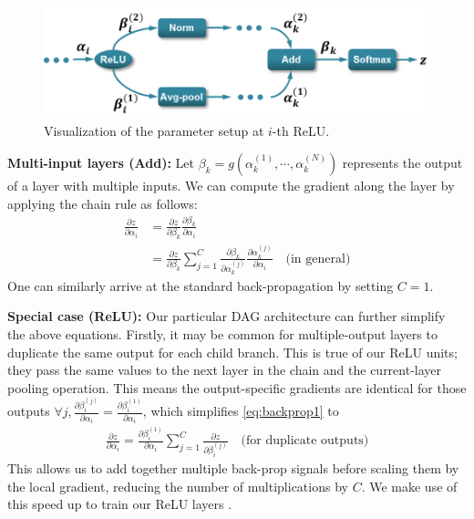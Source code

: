 \documentclass[10pt,twocolumn,letterpaper]{article}
\begin{document}
\begin{figure}[t!]
\centering
	\includegraphics[width=.85\columnwidth]{fig/fig_backprop_eq}
\caption{Visualization of the parameter setup at $i$-th ReLU.}
\label{fig:backprop_eq}
\end{figure}


{\bf Multi-input layers (Add):} Let $\beta_k=g(\alpha^{(1)}_k,\cdots,\alpha^{(N)}_k)$ represents the output of a layer with multiple inputs. We can compute the gradient along the layer by applying the chain rule as follows:
\vspace{-5pt}
\begin{align}
\frac{\partial z}{\partial \alpha_i}&=\frac{\partial z}{\partial \beta_k}\frac{\partial \beta_k}{\partial \alpha_i} \nonumber \\
&=\frac{\partial z}{\partial \beta_k}\sum_{j=1}^{C}\frac{\partial \beta_k}{\partial \alpha_k^{(j)}}\frac{\partial \alpha_k^{(j)}}{\partial \alpha_i} \quad \text{(in general)} \label{eq:backprop2}
\end{align} 
One can similarly arrive at the standard back-propagation by setting $C=1$.


{\bf Special case (ReLU):} Our particular DAG architecture can further simplify the above equations. Firstly, it may be common for multiple-output layers to duplicate the same output for each child branch. This is true of our ReLU units; they pass the same values to the next layer in the chain and the current-layer pooling operation. This means the output-specific gradients are identical for those outputs $\forall j, \frac{\partial \beta_i^{(j)}}{\partial \alpha_i} =  \frac{\partial \beta_i^{(1)}}{\partial \alpha_i}$, which simplifies \eqref{eq:backprop1} to
\vspace{-5pt}
\begin{align}
\frac{\partial z}{\partial \alpha_i} = \frac{\partial \beta_i^{(1)}}{\partial \alpha_i} \sum_{j=1}^{C}\frac{\partial z}{\partial \beta_i^{(j)}} \quad \text{(for duplicate outputs)}
\end{align}
This allows us to add together multiple back-prop signals before scaling them by the local gradient, reducing 
the number of multiplications by $C$. We make use of this speed up to train our ReLU layers
. 
\end{document}
